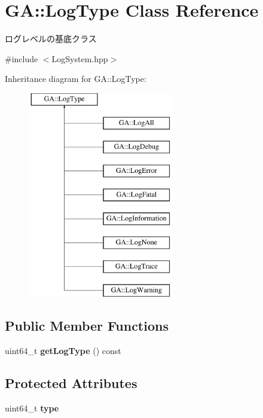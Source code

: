 \hypertarget{class_g_a_1_1_log_type}{}\section{GA\+::Log\+Type Class Reference}
\label{class_g_a_1_1_log_type}


ログレベルの基底クラス  




{\ttfamily \#include $<$Log\+System.\+hpp$>$}

Inheritance diagram for GA\+::Log\+Type\+:\begin{figure}[H]
\begin{center}
\leavevmode
\includegraphics[height=9.000000cm]{class_g_a_1_1_log_type}
\end{center}
\end{figure}
\subsection*{Public Member Functions}
\begin{DoxyCompactItemize}
\item 
\mbox{\label{class_g_a_1_1_log_type_a6239f4e1761585f048416e05dbb9f242}} 
uint64\+\_\+t {\bfseries get\+Log\+Type} () const
\end{DoxyCompactItemize}
\subsection*{Protected Attributes}
\begin{DoxyCompactItemize}
\item 
\mbox{\label{class_g_a_1_1_log_type_a663fc1aa2df92d978b2ca8e6ebb6f5f5}} 
uint64\+\_\+t {\bfseries type}
\end{DoxyCompactItemize}


